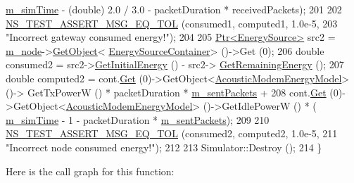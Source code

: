 \begin{DoxyCode}
      \hyperlink{classAcousticModemEnergyTestCase_a1d9e3ca9e65e9a76630d1d17f509a932}{m\_simTime} - (double) 2.0 / 3.0 - packetDuration * receivedPackets);
201 
202   \hyperlink{group__testing_ga9e7861b56b4e70db3b56044cb7a28e41}{NS\_TEST\_ASSERT\_MSG\_EQ\_TOL} (consumed1, computed1, 1.0e-5,
203                              \textcolor{stringliteral}{"Incorrect gateway consumed energy!"});
204 
205   \hyperlink{classns3_1_1Ptr}{Ptr<EnergySource>} src2 = \hyperlink{classAcousticModemEnergyTestCase_a70215894f46e0f4c11d7adb48fce7d44}{m\_node}->\hyperlink{classns3_1_1Object_a13e18c00017096c8381eb651d5bd0783}{GetObject}<
      \hyperlink{classns3_1_1EnergySourceContainer}{EnergySourceContainer}> ()->Get (0);
206   \textcolor{keywordtype}{double} consumed2 = src2->\hyperlink{classns3_1_1EnergySource_ae83935d4347fb88be5d823434a555365}{GetInitialEnergy} () - src2->
      \hyperlink{classns3_1_1EnergySource_a61bab0597d0ea719643a525515a3f5f1}{GetRemainingEnergy} ();
207   \textcolor{keywordtype}{double} computed2 = cont.\hyperlink{classns3_1_1DeviceEnergyModelContainer_ab7b49acea017b91801a4e7067db56eba}{Get} (0)->GetObject<\hyperlink{classns3_1_1AcousticModemEnergyModel}{AcousticModemEnergyModel}> ()->
      GetTxPowerW () * packetDuration * \hyperlink{classAcousticModemEnergyTestCase_a49500cd745308fd0b6fd3c607b13c624}{m\_sentPackets} +
208     cont.\hyperlink{classns3_1_1DeviceEnergyModelContainer_ab7b49acea017b91801a4e7067db56eba}{Get} (0)->GetObject<\hyperlink{classns3_1_1AcousticModemEnergyModel}{AcousticModemEnergyModel}> ()->GetIdlePowerW () * (
      \hyperlink{classAcousticModemEnergyTestCase_a1d9e3ca9e65e9a76630d1d17f509a932}{m\_simTime} - 1 - packetDuration * \hyperlink{classAcousticModemEnergyTestCase_a49500cd745308fd0b6fd3c607b13c624}{m\_sentPackets});
209 
210   \hyperlink{group__testing_ga9e7861b56b4e70db3b56044cb7a28e41}{NS\_TEST\_ASSERT\_MSG\_EQ\_TOL} (consumed2, computed2, 1.0e-5,
211                              \textcolor{stringliteral}{"Incorrect node consumed energy!"});
212 
213   Simulator::Destroy ();
214 \}
\end{DoxyCode}


Here is the call graph for this function\+:


